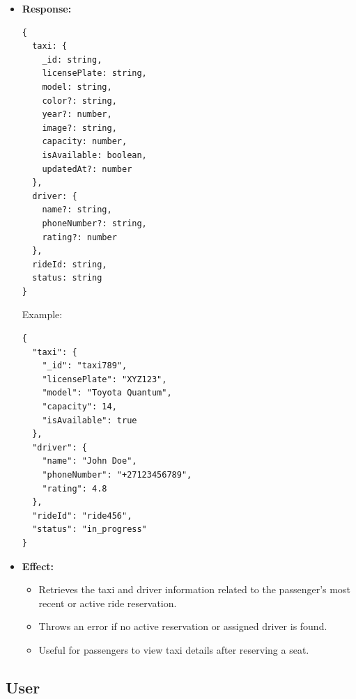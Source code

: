 \documentclass[a4paper,12pt]{article}
\begin{document}
\begin{enumerate}
\begin{itemize}
      \item \textbf{Response:}
      \begin{verbatim}
{
  taxi: {
    _id: string,
    licensePlate: string,
    model: string,
    color?: string,
    year?: number,
    image?: string,
    capacity: number,
    isAvailable: boolean,
    updatedAt?: number
  },
  driver: {
    name?: string,
    phoneNumber?: string,
    rating?: number
  },
  rideId: string,
  status: string
}
      \end{verbatim}
      Example:
      \begin{verbatim}
{
  "taxi": {
    "_id": "taxi789",
    "licensePlate": "XYZ123",
    "model": "Toyota Quantum",
    "capacity": 14,
    "isAvailable": true
  },
  "driver": {
    "name": "John Doe",
    "phoneNumber": "+27123456789",
    "rating": 4.8
  },
  "rideId": "ride456",
  "status": "in_progress"
}
      \end{verbatim}

      \item \textbf{Effect:}
      \begin{itemize}
        \item Retrieves the taxi and driver information related to the passenger's most recent or active ride reservation.
        \item Throws an error if no active reservation or assigned driver is found.
        \item Useful for passengers to view taxi details after reserving a seat.
      \end{itemize}
    \end{itemize}

\end{enumerate}

\subsection*{User}
\end{document}
